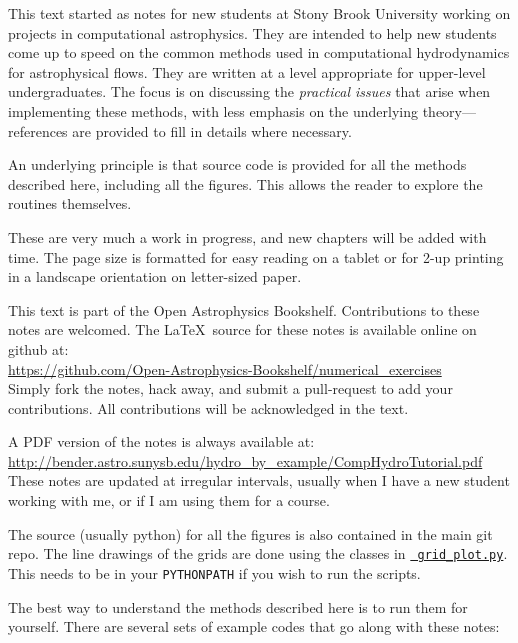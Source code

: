 
This text started as notes for new students at Stony Brook University
working on projects in computational astrophysics.  They are
intended  to help new students come up to speed on the
common methods used in computational hydrodynamics for astrophysical
flows.  They are written at a level appropriate for upper-level
undergraduates.  The focus is on discussing the {\em practical issues}
that arise when implementing these methods, with less emphasis on the
underlying theory---references are provided to fill in details where
necessary.

An underlying principle is that source code is provided for all the 
methods described here, including all the figures.  This allows
the reader to explore the routines themselves.

These are very much a work in progress, and new chapters will be
added with time.  The page size is formatted for easy reading
on a tablet or for 2-up printing in a landscape orientation on
letter-sized paper.  

This text is part of the Open Astrophysics Bookshelf.
Contributions to these notes are welcomed.  The \LaTeX\ source
for these notes is available online on github at: \\[0.25em]
%
\url{https://github.com/Open-Astrophysics-Bookshelf/numerical_exercises} \\[0.25em]
%
Simply fork the notes, hack away, and submit a pull-request to add
your contributions.  All contributions will be acknowledged in the text.


A PDF version of the notes is always available
at: \\[0.25em]
%
\url{http://bender.astro.sunysb.edu/hydro_by_example/CompHydroTutorial.pdf} \\[0.25em]
%
These notes are updated at irregular intervals, usually when I have a
new student working with me, or if I am using them for a course.

The source (usually python) for all the figures is also contained in
the main git repo.  The line drawings of the grids are done using the
classes in
\href{https://github.com/Open-Astrophysics-Bookshelf/numerical_exercises/blob/master/grid_plot.py}{{\tt
    grid\_plot.py}}.  This needs to be in your {\tt PYTHONPATH} if you
wish to run the scripts.

The best way to understand the methods described here is to run
them for yourself.  There are several sets of example codes that
go along with these notes:

